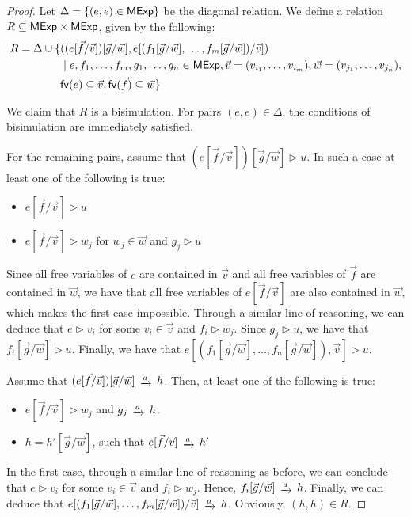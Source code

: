 \begin{proof}
	Let $\Delta = \{(e,e) \in \mathsf{MExp}\}$ be the diagonal relation. We define a relation ${R} \subseteq {\mathsf{MExp}\times \mathsf{MExp}}$, given by the following:
	\begin{align*}
		R = \Delta \cup \{&((e[\vec{f}/ \vec{v}])[\vec{g}/\vec{w}], e [(f_1[\vec{g}/\vec{w}], \dots, f_m[\vec{g}/\vec{w}])/\vec{v}])\\ &\mid e, f_1, \dots, f_m, g_1, \dots, g_n \in \mathsf{MExp}, \vec{v}=(v_{i_1}, \dots, v_{i_m}), \vec{w}=(v_{j_1}, \dots, v_{j_n}),\\ &\mathsf{fv}(e) \subseteq 		\vec{v},  \mathsf{fv}(\vec{f}) \subseteq \vec{w}\}
	\end{align*}

	
	 We claim that $R$ is a bisimulation. For pairs $(e,e) \in \Delta$, the conditions of bisimulation are immediately satisfied. 
	
	For the remaining pairs, assume that $(e[\vec{f}/ \vec{v}])[\vec{g}/\vec{w}] \rhd u$. In such a case at least one of the following is true:
	\begin{itemize}
		\item $e[\vec{f}/ \vec{v}] \rhd u$
		\item $e[\vec{f}/\vec{v}] \rhd w_j$ for $w_j \in \vec{w}$ and $g_j \rhd u$
	\end{itemize}
	Since all free variables of $e$ are contained in $\vec{v}$ and all free variables of $\vec{f}$ are contained in $\vec{w}$, we have that all free variables of $e[\vec{f}/\vec{v}]$ are also contained in $\vec{w}$, which makes the first case impossible. Through a similar line of reasoning, we can deduce that $e \rhd v_i$ for some $v_i \in \vec{v}$ and $f_i \rhd w_j$. Since $g_j \rhd u$, we have that $f_i[\vec{g}/\vec{w}] \rhd u$. Finally, we have that $e[(f_1[\vec{g}/\vec{w}], \dots, f_n[\vec{g}/\vec{w}]), \vec{v}] \rhd u$.
	
	Assume that $(e[\vec{f}/ \vec{v}])[\vec{g}/\vec{w}] \tr{a} h$. Then, at least one of the following is true:
	\begin{itemize}
		\item $e[\vec{f}/\vec{v}] \rhd w_j$ and $g_j \tr{a} h$.
		\item $h = h'[\vec{g}/\vec{w}]$, such that $e[\vec{f}/\vec{v}] \tr{a} h'$ 
	\end{itemize}
	In the first case, through a similar line of reasoning as before, we can conclude that $e \rhd{ v_i}$ for some $v_i \in \vec{v}$ and $f_i \rhd w_j$. Hence, $f_i [\vec{g}/\vec{w}] \tr{a} h $. Finally, we can deduce that $e[(f_1[\vec{g}/\vec{w}], \dots, f_m[\vec{g}/\vec{w}])/\vec{v}] \tr{a} h$. Obviously, $(h,h) \in R$.
	

\end{proof}
